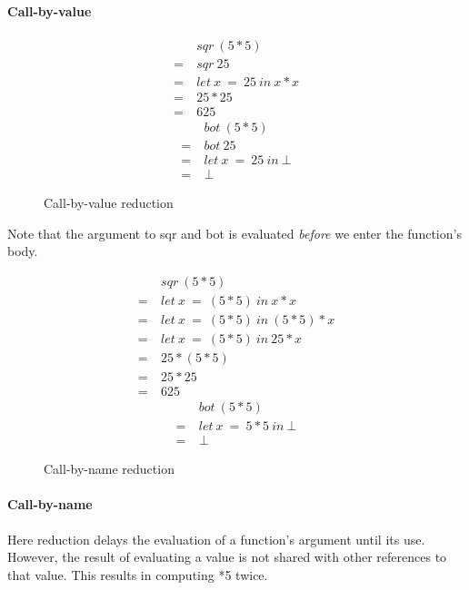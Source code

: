 \paragraph{Call-by-value}

\begin{figure}[!h]
\centering
\begin{multicols}{2}
\noindent
\begin{align*}
     &sqr\ (5*5) \\
  =\ &sqr\ 25 \\
  =\ &let\ x\ =\ 25\ in\ x * x \\
  =\ &25 * 25 \\
  =\ &625
\end{align*}
\begin{align*}
     &bot\ (5*5) \\
  =\ &bot\ 25 \\
  =\ &let\ x\ =\ 25\ in\ \bot \\
  =\ &\bot
\end{align*}
\end{multicols}
\caption{Call-by-value reduction}
\label{fig:call-by-value}
\end{figure}

Note that the argument to \<sqr\> and \<bot\> is evaluated \emph{before}
we enter the function's body. 

\pagebreak

\begin{figure}[!h]
\centering
\begin{multicols}{2}
\noindent
\begin{align*}
     &sqr\ (5*5) \\
  =\ &let\ x \  =\ (5*5)\ in\ x * x \\
  =\ &let\ x \  =\ (5*5)\ in\ (5*5) * x \\
  =\ &let\ x \  =\ (5*5)\ in\ 25 * x \\
  =\ &25 * (5*5) \\
  =\ &25 * 25 \\
  =\ &625
\end{align*}
\begin{align*}
     &bot\ (5*5) \\
  =\ &let\ x\ =\ 5*5\ in\ \bot \\
  =\ &\bot
\end{align*}
\end{multicols}
\caption{Call-by-name reduction}
\label{fig:call-by-name}
\end{figure}

\paragraph{Call-by-name} Here reduction delays the evaluation of a function's
argument until its use.  However, the result of evaluating a value is not
shared with other references to that value. This results in computing *5\>
twice.


